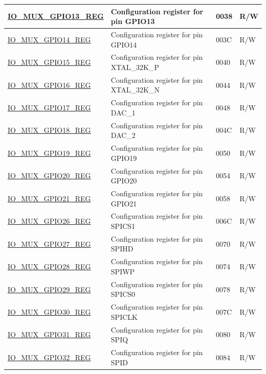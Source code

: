 \documentclass[main.tex]{subfiles}
\begin{document}
\begin{longtable}{ | p{5cm} | p{7.5cm} | p{2cm} | p{1cm} | }
\hyperref[regdesc:IOMUXnREG]{IO\_MUX\_GPIO13\_REG} & Configuration register for pin GPIO13 & \hexprefix{}0038 & R/W \\ \hline
\hyperref[regdesc:IOMUXnREG]{IO\_MUX\_GPIO14\_REG} & Configuration register for pin GPIO14 & \hexprefix{}003C & R/W \\ \hline
\hyperref[regdesc:IOMUXnREG]{IO\_MUX\_GPIO15\_REG} & Configuration register for pin XTAL\_32K\_P & \hexprefix{}0040 & R/W \\ \hline
\hyperref[regdesc:IOMUXnREG]{IO\_MUX\_GPIO16\_REG} & Configuration register for pin XTAL\_32K\_N & \hexprefix{}0044 & R/W \\ \hline
\hyperref[regdesc:IOMUXnREG]{IO\_MUX\_GPIO17\_REG} & Configuration register for pin DAC\_1 & \hexprefix{}0048 & R/W \\ \hline
\hyperref[regdesc:IOMUXnREG]{IO\_MUX\_GPIO18\_REG} & Configuration register for pin DAC\_2 & \hexprefix{}004C & R/W \\ \hline
\hyperref[regdesc:IOMUXnREG]{IO\_MUX\_GPIO19\_REG} & Configuration register for pin GPIO19 & \hexprefix{}0050 & R/W \\ \hline
\hyperref[regdesc:IOMUXnREG]{IO\_MUX\_GPIO20\_REG} & Configuration register for pin GPIO20 & \hexprefix{}0054 & R/W \\ \hline
\hyperref[regdesc:IOMUXnREG]{IO\_MUX\_GPIO21\_REG} & Configuration register for pin GPIO21 & \hexprefix{}0058 & R/W \\ \hline
\hyperref[regdesc:IOMUXnREG]{IO\_MUX\_GPIO26\_REG} & Configuration register for pin SPICS1 & \hexprefix{}006C & R/W \\ \hline
\hyperref[regdesc:IOMUXnREG]{IO\_MUX\_GPIO27\_REG} & Configuration register for pin SPIHD & \hexprefix{}0070 & R/W \\ \hline
\hyperref[regdesc:IOMUXnREG]{IO\_MUX\_GPIO28\_REG} & Configuration register for pin SPIWP & \hexprefix{}0074 & R/W \\ \hline
\hyperref[regdesc:IOMUXnREG]{IO\_MUX\_GPIO29\_REG} & Configuration register for pin SPICS0 & \hexprefix{}0078 & R/W \\ \hline
\hyperref[regdesc:IOMUXnREG]{IO\_MUX\_GPIO30\_REG} & Configuration register for pin SPICLK & \hexprefix{}007C & R/W \\ \hline
\hyperref[regdesc:IOMUXnREG]{IO\_MUX\_GPIO31\_REG} & Configuration register for pin SPIQ & \hexprefix{}0080 & R/W \\ \hline
\hyperref[regdesc:IOMUXnREG]{IO\_MUX\_GPIO32\_REG} & Configuration register for pin SPID & \hexprefix{}0084 & R/W \\ \hline

\end{longtable}
\end{document}
